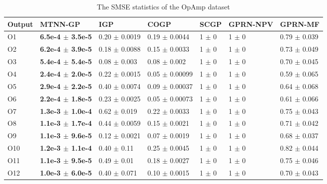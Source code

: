 \begin{table}[!htb]
    \centering
    \caption{The SMSE statistics of the OpAmp dataset}
    \label{tab:smse_DAC}
    \begin{tabular}{lllllll}
        \toprule
        Output & MTNN-GP                        &  IGP                  & COGP                  & SCGP          &  GPRN-NPV    & GPRN-MF            \\ \midrule
        O1     &  \textbf{6.5e-4 $\pm$  3.5e-5} &  0.20 $\pm$  0.0019   &  0.19 $\pm$  0.0044   &  1  $\pm$  0  &  1  $\pm$  0 &  0.79 $\pm$  0.039 \\
        O2     &  \textbf{6.2e-4 $\pm$  3.9e-5} &  0.18 $\pm$  0.0088   &  0.15 $\pm$  0.0033   &  1  $\pm$  0  &  1  $\pm$  0 &  0.73 $\pm$  0.049 \\
        O3     &  \textbf{5.4e-4 $\pm$  5.4e-5} &  0.08 $\pm$  0.003    &  0.08 $\pm$  0.002    &  1  $\pm$  0  &  1  $\pm$  0 &  0.70 $\pm$  0.045 \\
        O4     &  \textbf{2.4e-4 $\pm$  2.0e-5} &  0.22 $\pm$  0.0015   &  0.05 $\pm$  0.00099  &  1  $\pm$  0  &  1  $\pm$  0 &  0.59 $\pm$  0.065 \\
        O5     &  \textbf{2.9e-4 $\pm$  2.2e-5} &  0.40 $\pm$  0.0074   &  0.09 $\pm$  0.00037  &  1  $\pm$  0  &  1  $\pm$  0 &  0.64 $\pm$  0.068 \\
        O6     &  \textbf{2.2e-4 $\pm$  1.8e-5} &  0.23 $\pm$  0.0025   &  0.05 $\pm$  0.00073  &  1  $\pm$  0  &  1  $\pm$  0 &  0.61 $\pm$  0.066 \\
        O7     &  \textbf{1.3e-3 $\pm$  1.0e-4} &  0.62 $\pm$  0.019    &  0.22 $\pm$  0.0033   &  1  $\pm$  0  &  1  $\pm$  0 &  0.75 $\pm$  0.043 \\
        O8     &  \textbf{1.1e-3 $\pm$  1.7e-4} &  0.44 $\pm$  0.0059   &  0.15 $\pm$  0.0021   &  1  $\pm$  0  &  1  $\pm$  0 &  0.71 $\pm$  0.042 \\
        O9     &  \textbf{1.1e-3 $\pm$  9.6e-5} &  0.12 $\pm$  0.0021   &  0.07 $\pm$  0.0019   &  1  $\pm$  0  &  1  $\pm$  0 &  0.68 $\pm$  0.037 \\
        O10    &  \textbf{1.2e-3 $\pm$  1.1e-4} &  0.40 $\pm$  0.11     &  0.25 $\pm$  0.0045   &  1  $\pm$  0  &  1  $\pm$  0 &  0.82 $\pm$  0.044 \\
        O11    &  \textbf{1.1e-3 $\pm$  9.5e-5} &  0.49 $\pm$  0.01     &  0.18 $\pm$  0.0027   &  1  $\pm$  0  &  1  $\pm$  0 &  0.75 $\pm$  0.046 \\
        O12    &  \textbf{1.0e-3 $\pm$  6.0e-5} &  0.40 $\pm$  0.071    &  0.10 $\pm$  0.0015   &  1  $\pm$  0  &  1  $\pm$  0 &  0.70 $\pm$  0.043 \\

\end{tabular}
\end{table}
